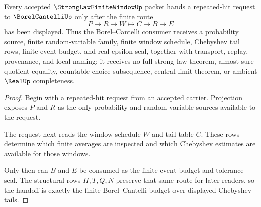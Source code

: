 \begin{theorem}\label{thm:strong-law-finite-window-borel-cantelli-handoff}
Every accepted $\StrongLawFiniteWindowUp$ packet hands a repeated-hit request to $\BorelCantelliUp$ only after the finite route
$$
P\longmapsto R\longmapsto W\longmapsto C\longmapsto B\longmapsto E
$$
has been displayed. Thus the Borel--Cantelli consumer receives a probability source, finite random-variable family, finite window schedule, Chebyshev tail rows, finite event budget, and real epsilon seal, together with transport, replay, provenance, and local naming; it receives no full strong-law theorem, almost-sure quotient equality, countable-choice subsequence, central limit theorem, or ambient $\RealUp$ completeness.
\end{theorem}
\begin{proof}
Begin with a repeated-hit request from an accepted carrier. Projection exposes $P$ and $R$ as the only probability and random-variable sources available to the request.

The request next reads the window schedule $W$ and tail table $C$. These rows determine which finite averages are inspected and which Chebyshev estimates are available for those windows.

Only then can $B$ and $E$ be consumed as the finite-event budget and tolerance seal. The structural rows $H,T,Q,N$ preserve that same route for later readers, so the handoff is exactly the finite Borel--Cantelli budget over displayed Chebyshev tails.
\end{proof}

